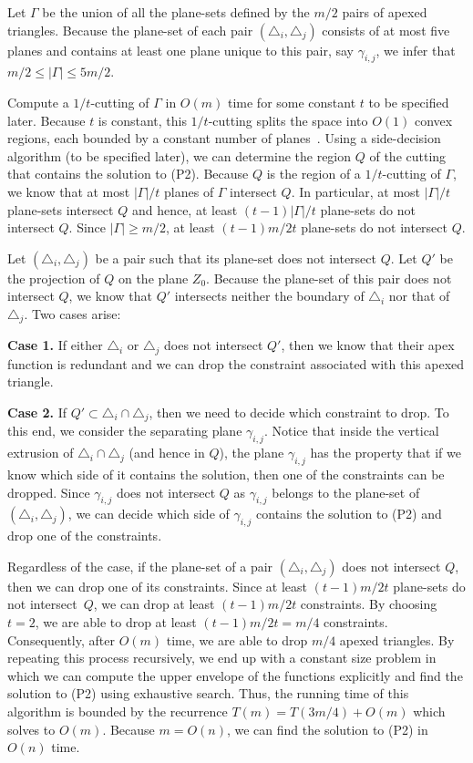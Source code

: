 \documentclass[a4paper,UKenglish]{lipics}
\begin{document}
Let $\Gamma$ be the union of all the plane-sets defined by the $m/2$ pairs of apexed triangles. 
Because the plane-set of each pair $(\triangle_i, \triangle_j)$ consists of at most five planes and contains at least one plane unique to this pair, say $\gamma_{i,j}$, we infer that $m/2\leq |\Gamma| \leq 5m/2$.

Compute a $1/t$-cutting of $\Gamma$ in $O(m)$ time for some constant $t$ to be specified later.
Because $t$ is constant, this $1/t$-cutting splits the space into $O(1)$ convex regions, each bounded by a constant number of planes~\cite{matousekCuttings}. 
Using a side-decision algorithm (to be specified later), we can determine the region $Q$ of the cutting that contains the solution to (P2). Because $Q$ is the region of a $1/t$-cutting of $\Gamma$, we know that at most $|\Gamma|/t$ planes of $\Gamma$ intersect $Q$. 
In particular, at most $|\Gamma|/t$ plane-sets intersect $Q$ and hence, at least $(t-1)|\Gamma|/t$ plane-sets do not intersect $Q$. 
Since $|\Gamma| \geq m/2$, at least $(t-1)m/2t$ plane-sets do not intersect $Q$.

Let $(\triangle_i, \triangle_j)$ be a pair such that its plane-set does not intersect $Q$. 
Let $Q'$ be the projection of $Q$ on the plane $Z_0$. Because the plane-set of this pair does not intersect $Q$, we know that $Q'$ intersects neither the boundary of $\triangle_i$ nor that of $\triangle_j$.
Two cases arise:

\textbf{Case 1.} If either $\triangle_i$ or $\triangle_j$ does not intersect $Q'$, then we know that their apex function is redundant and we can drop the constraint associated with this apexed triangle.

\textbf{Case 2.} If $Q'\subset \triangle_i\cap \triangle_j$, then we need to decide which constraint to drop. 
To this end, we consider the separating plane $\gamma_{i,j}$. Notice that inside the vertical extrusion of $\triangle_i\cap \triangle_j$ (and hence in $Q$), the plane $\gamma_{i,j}$ has the property that if we know which side of it contains the solution, then one of the constraints can be dropped. Since $\gamma_{i,j}$ does not intersect $Q$ as $\gamma_{i,j}$ belongs to the plane-set of $(\triangle_i, \triangle_j)$, we can decide which side of $\gamma_{i,j}$ contains the solution to (P2) and drop one of the constraints.
\vspace{.05in}

Regardless of the case, if the plane-set of a pair $(\triangle_i, \triangle_j)$ does not intersect $Q$, then we can drop one of its constraints. 
Since at least $(t-1)m/2t$ plane-sets do not intersect~$Q$, we can drop at least $(t-1)m/2t$ constraints.
By choosing $t = 2$, we are able to drop at least $(t-1)m/2t = m/4$ constraints.
Consequently, after $O(m)$ time, we are able to drop $m/4$ apexed triangles.
By repeating this process recursively, we end up with a constant size problem in which we can compute the upper envelope of the functions explicitly and find the solution to (P2) using exhaustive search. 
Thus, the running time of this algorithm is bounded by the recurrence $T(m) = T(3m/4) + O(m)$ which solves to $O(m)$. 
Because $m = O(n)$, we can find the solution to (P2) in $O(n)$ time.
\end{document}
